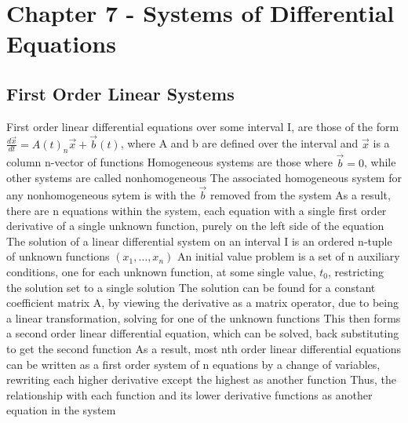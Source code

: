\documentclass[11 pt, twoside]{article}
\newenvironment{outline*}
{
	\begin{outline}[enumerate]
	}
	{\end{outline}
}
\begin{document}
\section{Chapter 7 - Systems of Differential Equations}
\subsection{First Order Linear Systems}
\begin{outline*}
\1 First order linear differential equations over some interval I, are those of the form $\frac{d\vec{x}}{dt} = A(t)_n\vec{x} + \vec{b}(t)$, where A and b are defined over the interval and $\vec{x}$ is a column n-vector of functions
\2 Homogeneous systems are those where $\vec{b} = 0$, while other systems are called nonhomogeneous
\3 The associated homogeneous system for any nonhomogeneous sytem is with the $\vec{b}$ removed from the system
\2 As a result, there are n equations within the system, each equation with a single first order derivative of a single unknown function, purely on the left side of the equation
\1 The solution of a linear differential system on an interval I is an ordered n-tuple of unknown functions $(x_1, \dots, x_n)$
\2 An initial value problem is a set of n auxiliary conditions, one for each unknown function, at some single value, $t_0$, restricting the solution set to a single solution
\1 The solution can be found for a constant coefficient matrix A, by viewing the derivative as a matrix operator, due to being a linear transformation, solving for one of the unknown functions
\2 This then forms a second order linear differential equation, which can be solved, back substituting to get the second function
\2 As a result, most nth order linear differential equations can be written as a first order system of n equations by a change of variables, rewriting each higher derivative except the highest as another function
\3 Thus, the relationship with each function and its lower derivative functions as another equation in the system
\end{outline*}
\end{document}
